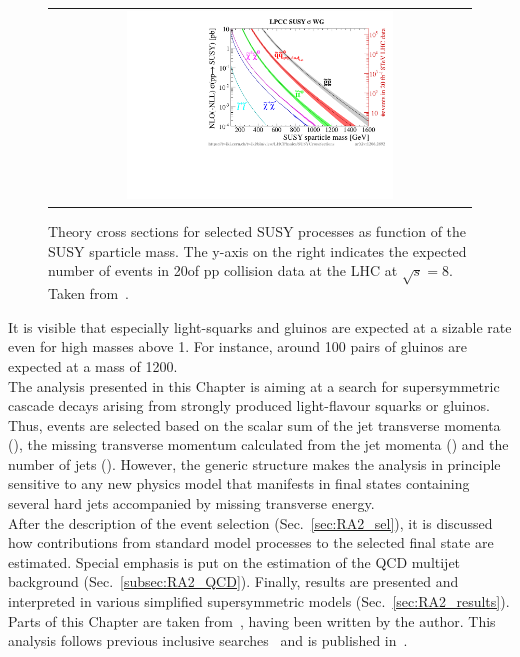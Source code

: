 \begin{figure}[!h]
  \centering
  \begin{tabular}{c}
                \includegraphics[width=0.65\textwidth]{figures/xsections_strong.pdf} 
  \end{tabular}
  \caption{Theory cross sections for selected SUSY processes as function of the SUSY sparticle mass. The y-axis on the right indicates the expected number of events in 20\fbinv of pp collision data at the LHC at $\sqrt{s}=8$\tev. Taken from~\cite{Kramer:2012bx}.}
  \label{fig:susy_theory_xs}
\end{figure}
It is visible that especially light-squarks and gluinos are expected at a sizable rate even for high masses above 1\tev. For instance, around 100 pairs of gluinos are expected at a mass of 1200\gev. \\
The analysis presented in this Chapter is aiming at a search for supersymmetric cascade decays arising from strongly produced light-flavour squarks or gluinos. Thus, events are selected based on the scalar sum of the jet transverse momenta (\HT), the missing transverse momentum calculated from the jet momenta (\MHT) and the number of jets (\NJets). However, the generic structure makes the analysis in principle sensitive to any new physics model that manifests in final states containing several hard jets accompanied by missing transverse energy. \\
After the description of the event selection (Sec.~\ref{sec:RA2_sel}), it is discussed how contributions from standard model processes to the selected final state are estimated. Special emphasis is put on the estimation of the QCD multijet background (Sec.~\ref{subsec:RA2_QCD}). Finally, results are presented and interpreted in various simplified supersymmetric models (Sec.~\ref{sec:RA2_results}). Parts of this Chapter are taken from~\cite{bib:AN-12-350}, having been written by the author. This analysis follows previous inclusive searches~\cite{springerlink:10.1007/JHEP08(2011)155, Chatrchyan:2012lia} and is published in~\cite{Chatrchyan:2014lfa}.    
